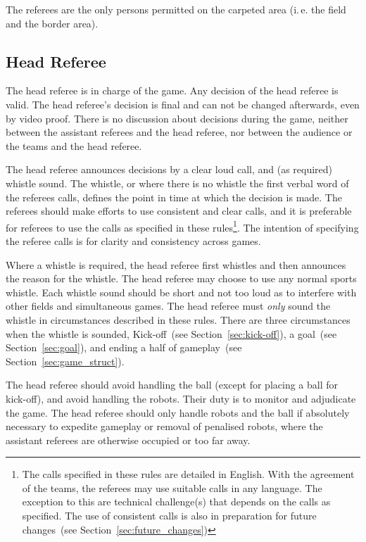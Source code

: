 \documentclass[12pt]{article}
\newcommand{\ie}{\mbox{i.\,e.}\xspace}
\newcommand{\cf}{see\xspace}
\begin{document}
The referees are the only persons permitted on the carpeted area (\ie the field and the border area).

\subsection{Head Referee}
\label{sec:head_referee}

The head referee is in charge of the game. Any decision of the head referee is valid. The head referee's decision is final and can not be changed afterwards, even by video proof. There is no discussion about decisions during the game, neither between the assistant referees and the head referee, nor between the audience or the teams and the head referee.

The head referee announces decisions by a clear loud call, and (as required) whistle sound.
The whistle, or where there is no whistle the first verbal word of the referees calls, defines the point in time at which the decision is made.
The referees should make efforts to use consistent and clear calls, and it is preferable for referees to use the calls as specified in these rules\footnote{The calls specified in these rules are detailed in English. With the agreement of the teams, the referees may use suitable calls in any language. The exception to this are technical challenge(s) that depends on the calls as specified. The use of consistent calls is also in preparation for future changes~(\cf Section~\ref{sec:future_changes})}.
The intention of specifying the referee calls is for clarity and consistency across games.

Where a whistle is required, the head referee first whistles and then announces the reason for the whistle.
The head referee may choose to use any normal sports whistle. 
Each whistle sound should be short and not too loud as to interfere with other fields and simultaneous games.
The head referee must \textit{only} sound the whistle in circumstances described in these rules.
There are three circumstances when the whistle is sounded, Kick-off~(\cf Section~\ref{sec:kick-off}), a goal~(\cf Section~\ref{sec:goal}), and ending a half of gameplay~(\cf Section~\ref{sec:game_struct}).

The head referee should avoid handling the ball (except for placing a ball for kick-off), and avoid handling the robots.
Their duty is to monitor and adjudicate the game.
The head referee should only handle robots and the ball if absolutely necessary to expedite gameplay or removal of penalised robots, where the assistant referees are otherwise occupied or too far away.
\end{document}

